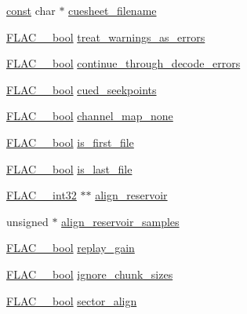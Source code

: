 \begin{DoxyCompactItemize}
\item 
\hyperlink{getopt1_8c_a2c212835823e3c54a8ab6d95c652660e}{const} char $\ast$ \hyperlink{structencode__options__t_ac37d1b3f6a4fdad4cc53a4a1faf6a05b}{cuesheet\+\_\+filename}
\item 
\hyperlink{ordinals_8h_a95103469f1cbd78b8cf250194985b34e}{F\+L\+A\+C\+\_\+\+\_\+bool} \hyperlink{structencode__options__t_acdc055ecba6920a4af136fe40e6a3911}{treat\+\_\+warnings\+\_\+as\+\_\+errors}
\item 
\hyperlink{ordinals_8h_a95103469f1cbd78b8cf250194985b34e}{F\+L\+A\+C\+\_\+\+\_\+bool} \hyperlink{structencode__options__t_abe7efbf29786cbcbe3624b9618219eb1}{continue\+\_\+through\+\_\+decode\+\_\+errors}
\item 
\hyperlink{ordinals_8h_a95103469f1cbd78b8cf250194985b34e}{F\+L\+A\+C\+\_\+\+\_\+bool} \hyperlink{structencode__options__t_af48dd92ab1a18d1a62006e63ffc44b7d}{cued\+\_\+seekpoints}
\item 
\hyperlink{ordinals_8h_a95103469f1cbd78b8cf250194985b34e}{F\+L\+A\+C\+\_\+\+\_\+bool} \hyperlink{structencode__options__t_ac2e8a7f51963de11ec0cc2c17c3534ff}{channel\+\_\+map\+\_\+none}
\item 
\hyperlink{ordinals_8h_a95103469f1cbd78b8cf250194985b34e}{F\+L\+A\+C\+\_\+\+\_\+bool} \hyperlink{structencode__options__t_a5eb06c070110743208687e0bbe86092d}{is\+\_\+first\+\_\+file}
\item 
\hyperlink{ordinals_8h_a95103469f1cbd78b8cf250194985b34e}{F\+L\+A\+C\+\_\+\+\_\+bool} \hyperlink{structencode__options__t_a5055d03746345df9160d467716bbd592}{is\+\_\+last\+\_\+file}
\item 
\hyperlink{ordinals_8h_a33fd77bfe6d685541a0c034a75deccdc}{F\+L\+A\+C\+\_\+\+\_\+int32} $\ast$$\ast$ \hyperlink{structencode__options__t_a471dcdd0ec95ce3ffec1114ddeeb7ef6}{align\+\_\+reservoir}
\item 
unsigned $\ast$ \hyperlink{structencode__options__t_aeab408796c7f402e721fcad7c277574b}{align\+\_\+reservoir\+\_\+samples}
\item 
\hyperlink{ordinals_8h_a95103469f1cbd78b8cf250194985b34e}{F\+L\+A\+C\+\_\+\+\_\+bool} \hyperlink{structencode__options__t_a13cf9646a8026f97ee0cc351e54d90f7}{replay\+\_\+gain}
\item 
\hyperlink{ordinals_8h_a95103469f1cbd78b8cf250194985b34e}{F\+L\+A\+C\+\_\+\+\_\+bool} \hyperlink{structencode__options__t_af00a6364d6df1737f12b395da3b81966}{ignore\+\_\+chunk\+\_\+sizes}
\item 
\hyperlink{ordinals_8h_a95103469f1cbd78b8cf250194985b34e}{F\+L\+A\+C\+\_\+\+\_\+bool} \hyperlink{structencode__options__t_a8be8aa269f841975ab566058cfbe664c}{sector\+\_\+align}
$$
\end{DoxyCompactItemize}
